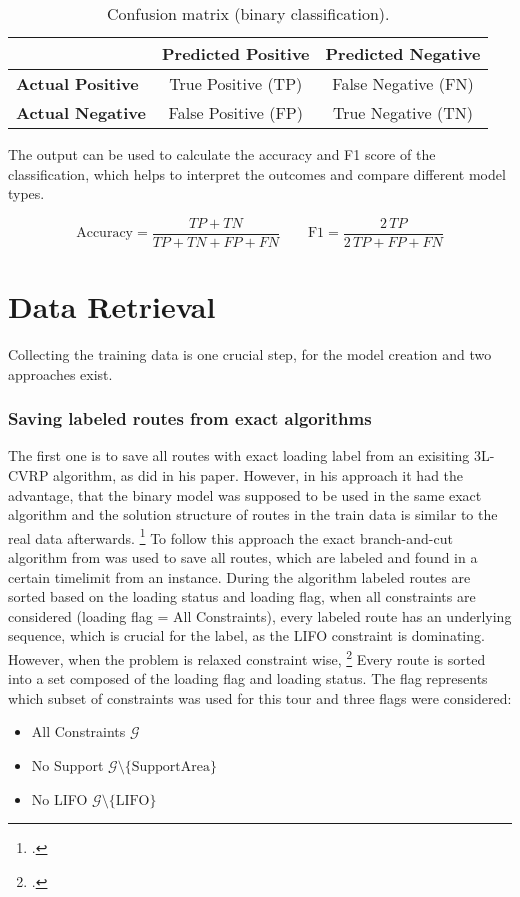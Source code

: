 \begin{table}[ht]
    \centering
    \begin{tabular}{@{}lcc@{}}
        \toprule
                                 & \textbf{Predicted Positive} & \textbf{Predicted Negative} \\
        \midrule
        \textbf{Actual Positive} & True Positive (TP)          & False Negative (FN)         \\
        \textbf{Actual Negative} & False Positive (FP)         & True Negative (TN)          \\
        \bottomrule
    \end{tabular}
    \caption{Confusion matrix (binary classification).}
    \label{tab:confusion_matrix}
\end{table}
The output can be used to calculate the accuracy and F1 score of the classification, which
helps to interpret the outcomes and compare different model types.

\[
    \text{Accuracy}=\frac{TP+TN}{TP+TN+FP+FN}
    \qquad
    \text{F1}=\frac{2\,TP}{2\,TP+FP+FN}
\]


\section{Data Retrieval}
\label{sec:DataRetrieval}
Collecting the training data is one crucial step, for the model creation and two approaches exist.

\subsubsection{Saving labeled routes from exact algorithms}
The first one is to save all routes with exact loading label from an exisiting \gls{3L-CVRP}
algorithm, as \cite{zhang_learning-based_2022} did in his paper. However, in his approach it
had the advantage, that the binary model was supposed to be used in the same exact algorithm
and the solution structure of routes in the train data is similar to the real data afterwards. \footcite[cf.][]{zhang_learning-based_2022}
To follow this approach the exact branch-and-cut algorithm from \cite{tamke_branch-and-cut_2024} was
used to save all routes, which are labeled and found in a certain timelimit from an instance. During
the algorithm labeled routes are sorted based on the loading status and loading flag, when all
constraints are considered (loading flag = All Constraints), every labeled route has an underlying
sequence, which is crucial for the label, as the \gls{LIFO} constraint is dominating. However,
when the problem is relaxed constraint wise,
\footcites[Retrieved from][]{tamke_repository_2024}[cf.][]{tamke_branch-and-cut_2024} Every route
is sorted into a set composed of the loading flag and loading status. The flag represents which
subset of constraints was used for this tour and three flags were considered:
\begin{itemize}
    \item All Constraints $\mathcal{G}$
    \item No Support $\mathcal{G}\setminus \{\text{SupportArea}\}$
    \item No LIFO $\mathcal{G}\setminus \{\text{LIFO}\}$
\end{itemize}

